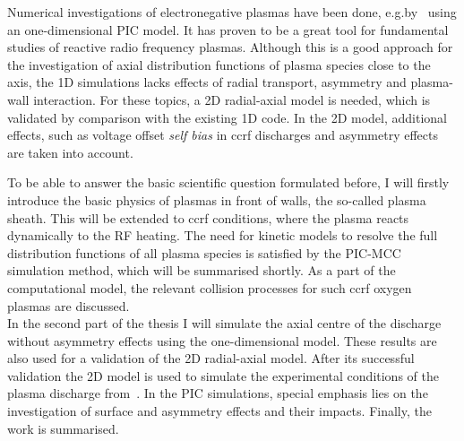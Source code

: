         Numerical investigations of electronegative plasmas have been done, e.g.\@ by~\cite{Matyash07oxIII,Bronold07b,Matthias15} using an one-dimensional PIC model. It has proven to be a great tool for fundamental studies of reactive radio frequency plasmas. Although this is a good approach for the investigation of axial distribution functions of plasma species close to the axis, the 1D simulations lacks effects of radial transport, asymmetry and plasma-wall interaction. For these topics, a 2D radial-axial model is needed, which is validated by comparison with the existing 1D code. In the 2D model, additional effects, such as voltage offset \emph{self bias} in ccrf discharges and asymmetry effects are taken into account.%
%        
        \par\bigskip
        To be able to answer the basic scientific question formulated before, I will firstly introduce the basic physics of plasmas in front of walls, the so-called plasma sheath. This will be extended to ccrf conditions, where the plasma reacts dynamically to the RF heating. The need for kinetic models to resolve the full distribution functions of all plasma species is satisfied by the PIC-MCC simulation method, which will be summarised shortly. As a part of the computational model, the relevant collision processes for such ccrf oxygen plasmas are discussed.\\
        In the second part of the thesis I will simulate the axial centre of the discharge without asymmetry effects using the one-dimensional model. These results are also used for a validation of the 2D radial-axial model.  After its successful validation the 2D model is used to simulate the experimental conditions of the plasma discharge from~\cite{Scheuer15}. In the PIC simulations, special emphasis lies on the investigation of surface and asymmetry effects and their impacts. Finally, the work is summarised.